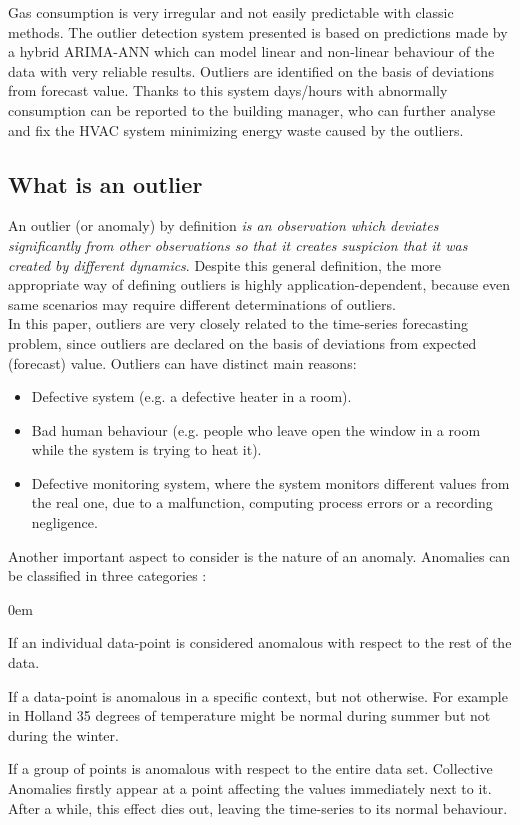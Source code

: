 \documentclass{sig-alternate-sigmod07}
\begin{document}
Gas consumption is very irregular and not easily predictable with classic methods. The outlier detection system presented is based on predictions made by a hybrid ARIMA-ANN which can model linear and non-linear behaviour of the data with very reliable results. Outliers are identified on the basis of deviations from forecast value. Thanks to this system days/hours with abnormally consumption can be reported to the building manager, who can further analyse and fix the HVAC system minimizing energy waste caused by the outliers.




\subsection{What is an outlier}
An outlier (or anomaly) by definition \cite{hawkins1980identification} \emph{is an observation which deviates significantly from other observations so that it creates suspicion that it was created by different dynamics}. Despite this general definition, the more appropriate way of defining outliers is highly application-dependent, because even same scenarios may require different determinations of outliers. \\
In this paper, outliers are very closely related to the time-series forecasting problem, since outliers are declared on the basis of deviations from expected (forecast) value. Outliers can have distinct main reasons: 
\begin{itemize}
\itemsep0em
  \item Defective system (e.g. a defective heater in a room).
  \item Bad human behaviour (e.g. people who leave open the window in a room while the system is trying to heat it).
  \item Defective monitoring system, where the system monitors different values from the real one, due to a malfunction, computing process errors or a recording negligence. 
\end{itemize}
Another important aspect to consider is the nature of an anomaly. Anomalies can be classified in three categories \cite{chandola2009anomaly}:\begin{description}[font=\normalfont\itshape,leftmargin=1pc]
\itemsep0em
  \item[Point Anomalies] If an individual data-point is considered anomalous with respect to the rest of the data.
  \item[Contextual Anomalies] If a data-point is anomalous in a specific context, but not otherwise. For example in Holland 35 degrees of temperature might be normal during summer but not during the winter.
  \item[Collective Anomalies] If a group of points is anomalous with respect to the entire data set. Collective Anomalies firstly appear at a point affecting the values immediately next to it. After a while, this effect dies out, leaving the time-series to its normal behaviour.
\end{description}
\end{document}
